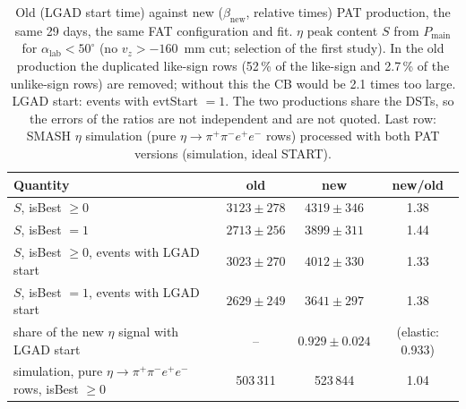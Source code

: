 \begin{table}[H]
\centering\small
\setlength{\tabcolsep}{4pt}
\caption{Old (LGAD start time) against new ($\beta_\mathrm{new}$, relative times) PAT production, the same 29 days, the same FAT configuration and fit.
$\eta$ peak content $S$ from $P_\mathrm{main}$ for $\alpha_\mathrm{lab}<50^\circ$ (no $v_z>-160$~mm cut; selection of the first study).
In the old production the duplicated like-sign rows (52\,\% of the like-sign and 2.7\,\% of the unlike-sign rows) are removed; without this the CB would be 2.1 times too large.
LGAD start: events with evtStart $=1$. The two productions share the DSTs, so the errors of the ratios are not independent and are not quoted.
Last row: SMASH $\eta$ simulation (pure $\eta\to\pi^+\pi^-e^+e^-$ rows) processed with both PAT versions (simulation, ideal START).}
\label{tab:res_oldnew}
\begin{tabular}{lccc}
\toprule
Quantity & old & new & new/old \\
\midrule
$S$, isBest $\geq0$ & $3123\pm278$ & $4319\pm346$ & 1.38 \\
$S$, isBest $=1$ & $2713\pm256$ & $3899\pm311$ & 1.44 \\
$S$, isBest $\geq0$, events with LGAD start & $3023\pm270$ & $4012\pm330$ & 1.33 \\
$S$, isBest $=1$, events with LGAD start & $2629\pm249$ & $3641\pm297$ & 1.38 \\
share of the new $\eta$ signal with LGAD start & -- & $0.929\pm0.024$ & (elastic: 0.933) \\
\midrule
simulation, pure $\eta\to\pi^+\pi^-e^+e^-$ rows, isBest $\geq0$ & 503\,311 & 523\,844 & 1.04 \\
\bottomrule
\end{tabular}
\end{table}
